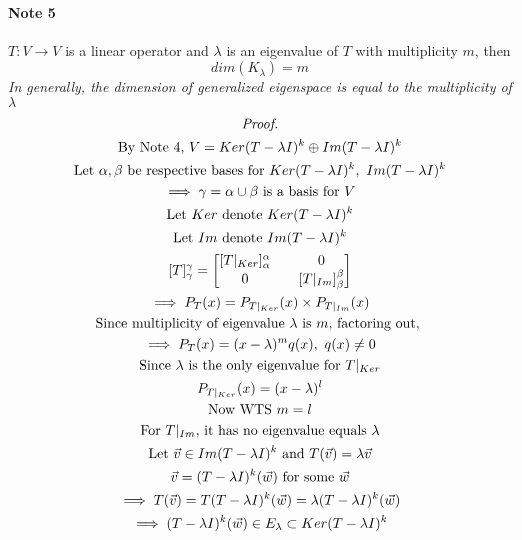 \documentclass[11pt]{article}
\newcommand{\trans}[3]{{#1}: {#2} \to {#3}}
\newcommand{\tmat}[3]{[{#1}]_{{#2}}^{{#3}}}
\newcommand{\tx}[1]{\text{{#1}}}
\begin{document}
	\paragraph{Note 5} $\trans{T}{V}{V}$ is a linear operator and $\lambda$ is an eigenvalue of $T$ with multiplicity $m$, then 
	\[
		dim(K_{\lambda}) = m
	\]
	\emph{In generally, the dimension of generalized eigenspace is equal to the multiplicity of $\lambda$}
	\begin{multline*}
		\emph{Proof.} \\
		\text{By Note 4, }V = Ker(T - \lambda I)^k \oplus Im(T - \lambda I)^k \\
		\text{Let } \alpha, \beta \text{ be respective bases for } Ker(T - \lambda I)^k,\ Im(T - \lambda I)^k \\
		\implies \gamma = \alpha \cup \beta \text{ is a basis for } V \\
		\tx{Let } Ker \tx{ denote } Ker(T - \lambda I)^k \\
		\tx{Let } Im \tx{ denote } Im(T - \lambda I)^k \\ 
		\tmat{T}{\gamma}{\gamma} = 
		\begin{bmatrix}
			\tmat{T\vert_{Ker}}{\alpha}{\alpha} && 0 \\
			0 && \tmat{T\vert_{Im}}{\beta}{\beta} \\
		\end{bmatrix} \\
		\implies P_{T}(x) = P_{T\vert_{Ker}}(x) \times P_{T \vert_{Im}}(x)\\
		\text{Since multiplicity of eigenvalue $\lambda$ is $m$, factoring out, }\\
		\implies P_T(x) = (x-\lambda)^m q(x),\ q(x)\neq 0\\
		\text{Since $\lambda$ is the only eigenvalue for } T\vert_{Ker} \\
		P_{T\vert_{Ker}}(x) = (x-\lambda)^l \\
		\text{Now WTS } m = l\\
		\text{For } T\vert_{Im} \text{, it has no eigenvalue equals $\lambda$} \\
		\text{Let } \vec{v} \in Im(T - \lambda I)^k \text{ and } T(\vec{v}) = \lambda \vec{v} \\
		\vec{v} = (T - \lambda I)^k(\vec{w})\text{ for some } \vec{w} \\
		\implies T(\vec{v}) = T(T - \lambda I)^k (\vec{w}) = \lambda (T - \lambda I)^k(\vec{w}) \\
		\implies (T - \lambda I)^k(\vec{w}) \in E_{\lambda} \subset Ker(T - \lambda I)^k \\

\end{multline*}
\end{document}
